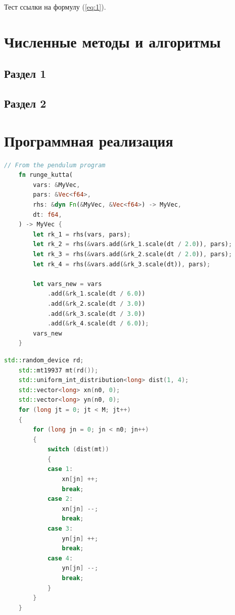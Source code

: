 \documentclass[14pt,oneside]{extarticle}
\begin{document}
Тест ссылки на формулу (\ref{eq:1}).

\pagebreak
\section{Численные методы и алгоритмы}

\subsection{Раздел 1}

\subsection{Раздел 2}

\pagebreak
\section{Программная реализация}

\begin{lstlisting}[language=rust,caption={Программная реализация метода Рунге-Кутты},label={listing-1}]
    // From the pendulum program
    fn runge_kutta(
        vars: &MyVec,
        pars: &Vec<f64>,
        rhs: &dyn Fn(&MyVec, &Vec<f64>) -> MyVec,
        dt: f64,
    ) -> MyVec {
        let rk_1 = rhs(vars, pars);
        let rk_2 = rhs(&vars.add(&rk_1.scale(dt / 2.0)), pars);
        let rk_3 = rhs(&vars.add(&rk_2.scale(dt / 2.0)), pars);
        let rk_4 = rhs(&vars.add(&rk_3.scale(dt)), pars);
    
        let vars_new = vars
            .add(&rk_1.scale(dt / 6.0))
            .add(&rk_2.scale(dt / 3.0))
            .add(&rk_3.scale(dt / 3.0))
            .add(&rk_4.scale(dt / 6.0));
        vars_new
    }
    \end{lstlisting}
    
    \begin{lstlisting}[language=C++,caption={Подпрограмма случайного блуждания на плоскости},label={listing-2}]
    std::random_device rd;
    std::mt19937 mt(rd());
    std::uniform_int_distribution<long> dist(1, 4);
    std::vector<long> xn(n0, 0);
    std::vector<long> yn(n0, 0);
    for (long jt = 0; jt < M; jt++)
    {
        for (long jn = 0; jn < n0; jn++)
        {
            switch (dist(mt))
            {
            case 1:
                xn[jn] ++;
                break;
            case 2:
                xn[jn] --;
                break;
            case 3:
                yn[jn] ++;
                break;
            case 4:
                yn[jn] --;
                break;
            }
        }
    }
    \end{lstlisting}
\end{document}
